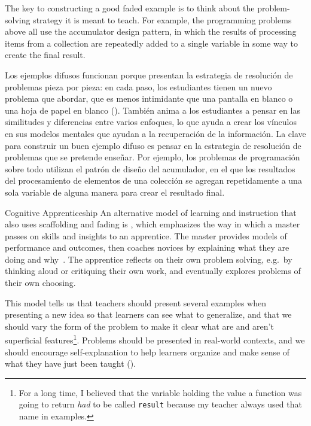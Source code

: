 The key to constructing a good faded example is
to think about the problem-solving strategy it is meant to teach.
For example,
the programming problems above all use the accumulator design pattern,
in which the results of processing items from a collection
are repeatedly added to a single variable in some way to create the final result.

Los ejemplos difusos funcionan porque presentan la estrategia de resolución de problemas pieza por pieza: en cada paso, los estudiantes tienen un nuevo problema que abordar, que es menos intimidante que una pantalla en blanco o una hoja de papel en blanco (). También anima a los estudiantes a pensar en las similitudes y diferencias entre varios enfoques, lo que ayuda a crear los vínculos en sus modelos mentales que ayudan a la recuperación de la información.
La clave para construir un buen ejemplo difuso es pensar en la estrategia de resolución de problemas que se pretende enseñar. Por ejemplo, los problemas de programación sobre todo utilizan el patrón de diseño del acumulador, en el que los resultados del procesamiento de elementos de una colección se agregan repetidamente a una sola variable de alguna manera para crear el resultado final.


\begin{aside}{Cognitive Apprenticeship}
  An alternative model of learning and instruction that also uses scaffolding and fading
  is ,
  which emphasizes the way in which a master passes on skills and insights to an apprentice.
  The master provides models of performance and outcomes,
  then coaches novices by explaining what they are doing and why~\cite{Coll1991,Casp2007}.
  The apprentice reflects on their own problem solving,
  e.g.\ by thinking aloud or critiquing their own work,
  and eventually explores problems of their own choosing.

  This model tells us that
  teachers should present several examples when presenting a new idea
  so that learners can see what to generalize,
  and that we should vary the form of the problem to make it clear
  what are and aren't superficial features\footnote{For a long time,
    I believed that the variable holding the value a function was going to return
    \emph{had} to be called \texttt{result}
    because my teacher always used that name in examples.}.
  Problems should be presented in real-world contexts,
  and we should encourage self-explanation to help learners organize and make sense of what they have just been taught
  ().
\end{aside}


